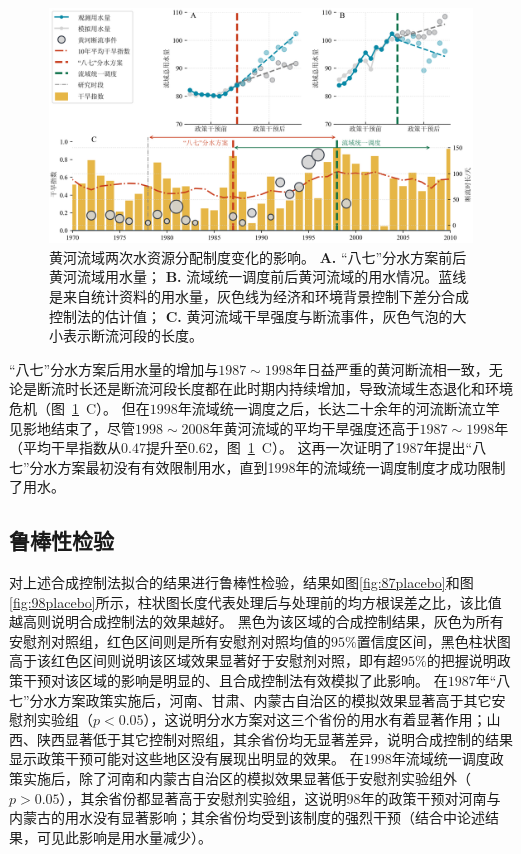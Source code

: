 \begin{figure}[!htb]
	\centering
	\includegraphics[width=\linewidth]{img/ch5/ch5_results.png}
	\caption[黄河流域两次水资源分配制度变化的影响]{
        黄河流域两次水资源分配制度变化的影响。
        \textbf{A.} “八七”分水方案前后黄河流域用水量；
        \textbf{B.} 流域统一调度前后黄河流域的用水情况。蓝线是来自统计资料的用水量，灰色线为经济和环境背景控制下差分合成控制法的估计值；
        \textbf{C.} 黄河流域干旱强度与断流事件，灰色气泡的大小表示断流河段的长度。
	}\label{ch5:fig:main_results}
\end{figure}

“八七”分水方案后用水量的增加与$1987 \sim 1998$年日益严重的黄河断流相一致，无论是断流时长还是断流河段长度都在此时期内持续增加，导致流域生态退化和环境危机（图~\ref{ch5:fig:main_results}~C）。
但在$1998$年流域统一调度之后，长达二十余年的河流断流立竿见影地结束了，尽管$1998 \sim 2008$年黄河流域的平均干旱强度还高于$1987 \sim 1998$年（平均干旱指数从$0.47$提升至$0.62$，图~\ref{ch5:fig:main_results}~C）。
这再一次证明了1987年提出“八七”分水方案最初没有有效限制用水，直到1998年的流域统一调度制度才成功限制了用水。

\subsection{鲁棒性检验}

对上述合成控制法拟合的结果进行鲁棒性检验，结果如图\ref{fig:87placebo}和图\ref{fig:98placebo}所示，柱状图长度代表处理后与处理前的均方根误差之比，该比值越高则说明合成控制法的效果越好。
黑色为该区域的合成控制结果，灰色为所有安慰剂对照组，红色区间则是所有安慰剂对照均值的$95\%$置信度区间，黑色柱状图高于该红色区间则说明该区域效果显著好于安慰剂对照，即有超$95\%$的把握说明政策干预对该区域的影响是明显的、且合成控制法有效模拟了此影响。
在$1987$年“八七”分水方案政策实施后，河南、甘肃、内蒙古自治区的模拟效果显著高于其它安慰剂实验组（$p < 0.05$），这说明分水方案对这三个省份的用水有着显著作用；山西、陕西显著低于其它控制对照组，其余省份均无显著差异，说明合成控制的结果显示政策干预可能对这些地区没有展现出明显的效果。
在$1998$年流域统一调度政策实施后，除了河南和内蒙古自治区的模拟效果显著低于安慰剂实验组外（$p > 0.05$），其余省份都显著高于安慰剂实验组，这说明98年的政策干预对河南与内蒙古的用水没有显著影响；其余省份均受到该制度的强烈干预（结合中论述结果，可见此影响是用水量减少）。

